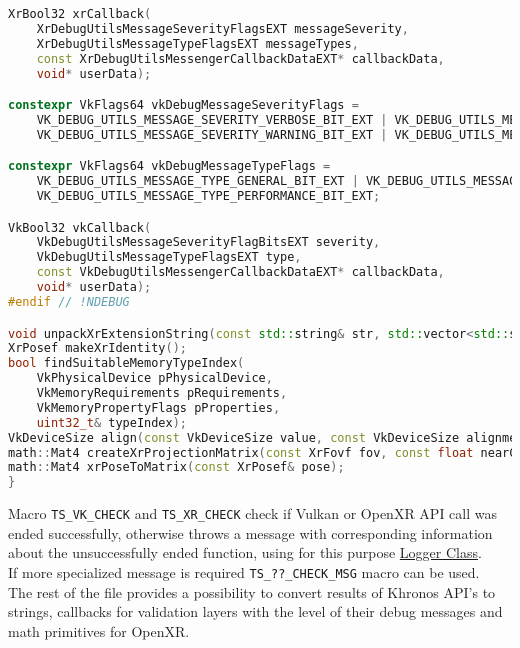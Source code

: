 \begin{itemize}
\begin{lstlisting}[language=c++, caption=Khronos Utils (./engine/src/khronos\_utils.h)]
XrBool32 xrCallback(
    XrDebugUtilsMessageSeverityFlagsEXT messageSeverity,
    XrDebugUtilsMessageTypeFlagsEXT messageTypes,
    const XrDebugUtilsMessengerCallbackDataEXT* callbackData,
    void* userData);

constexpr VkFlags64 vkDebugMessageSeverityFlags =
    VK_DEBUG_UTILS_MESSAGE_SEVERITY_VERBOSE_BIT_EXT | VK_DEBUG_UTILS_MESSAGE_SEVERITY_INFO_BIT_EXT |
    VK_DEBUG_UTILS_MESSAGE_SEVERITY_WARNING_BIT_EXT | VK_DEBUG_UTILS_MESSAGE_SEVERITY_ERROR_BIT_EXT;

constexpr VkFlags64 vkDebugMessageTypeFlags =
    VK_DEBUG_UTILS_MESSAGE_TYPE_GENERAL_BIT_EXT | VK_DEBUG_UTILS_MESSAGE_TYPE_VALIDATION_BIT_EXT |
    VK_DEBUG_UTILS_MESSAGE_TYPE_PERFORMANCE_BIT_EXT;

VkBool32 vkCallback(
    VkDebugUtilsMessageSeverityFlagBitsEXT severity,
    VkDebugUtilsMessageTypeFlagsEXT type,
    const VkDebugUtilsMessengerCallbackDataEXT* callbackData,
    void* userData);
#endif // !NDEBUG

void unpackXrExtensionString(const std::string& str, std::vector<std::string>& result);
XrPosef makeXrIdentity();
bool findSuitableMemoryTypeIndex(
    VkPhysicalDevice pPhysicalDevice,
    VkMemoryRequirements pRequirements,
    VkMemoryPropertyFlags pProperties,
    uint32_t& typeIndex);
VkDeviceSize align(const VkDeviceSize value, const VkDeviceSize alignment);
math::Mat4 createXrProjectionMatrix(const XrFovf fov, const float nearClip, const float farClip);
math::Mat4 xrPoseToMatrix(const XrPosef& pose);
}
\end{lstlisting}
Macro \texttt{TS\_VK\_CHECK} and \texttt{TS\_XR\_CHECK} check if Vulkan or OpenXR API call was ended successfully, otherwise throws a message with corresponding information about the unsuccessfully ended function, using for this purpose \hyperref[sec:logger]{Logger Class}.\\
If more specialized message is required \texttt{TS\_??\_CHECK\_MSG} macro can be used.\\
The rest of the file provides a possibility to convert results of Khronos API's to strings, callbacks for validation layers with the level of their debug messages and math primitives for OpenXR.
\end{itemize}